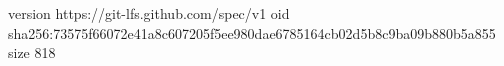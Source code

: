 version https://git-lfs.github.com/spec/v1
oid sha256:73575f66072e41a8c607205f5ee980dae6785164cb02d5b8c9ba09b880b5a855
size 818

